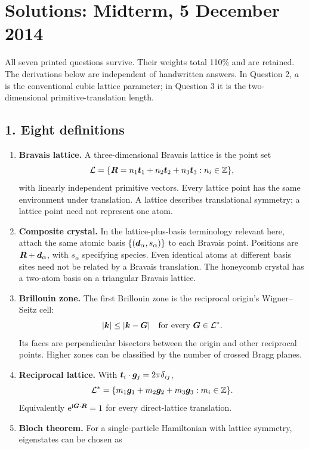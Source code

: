 \chapter{Solutions: Midterm, 5 December 2014}
\label{s:theory-2014-12-midterm}
\begin{sourceNote}
All seven printed questions survive. Their weights total 110\% and are retained. The derivations below are independent of handwritten answers. In Question 2, $a$ is the conventional cubic lattice parameter; in Question 3 it is the two-dimensional primitive-translation length.
\end{sourceNote}

\section*{1. Eight definitions}
\begin{enumerate}[label=(\alph*)]
\item \textbf{Bravais lattice.}
A three-dimensional Bravais lattice is the point set
\[
\mathcal L=\{\boldsymbol{R}=n_1\boldsymbol{t}_1+n_2\boldsymbol{t}_2+n_3\boldsymbol{t}_3:n_i\in\mathbb Z\},
\]
with linearly independent primitive vectors. Every lattice point has the same environment under translation. A lattice describes translational symmetry; a lattice point need not represent one atom.
\item \textbf{Composite crystal.}
In the lattice-plus-basis terminology relevant here, attach the same atomic basis $\{(\boldsymbol{d}_\alpha,s_\alpha)\}$ to each Bravais point. Positions are $\boldsymbol{R}+\boldsymbol{d}_\alpha$, with $s_\alpha$ specifying species. Even identical atoms at different basis sites need not be related by a Bravais translation. The honeycomb crystal has a two-atom basis on a triangular Bravais lattice.
\item \textbf{Brillouin zone.}
The first Brillouin zone is the reciprocal origin's Wigner--Seitz cell:
\[
|\boldsymbol{k}|\leq|\boldsymbol{k}-\boldsymbol{G}|\quad\hbox{for every }\boldsymbol{G}\in\mathcal L^*.
\]
Its faces are perpendicular bisectors between the origin and other reciprocal points. Higher zones can be classified by the number of crossed Bragg planes.
\item \textbf{Reciprocal lattice.}
With $\boldsymbol{t}_i\cdot\boldsymbol{g}_j=2\pi\delta_{ij}$,
\[
\mathcal L^*=\{m_1\boldsymbol{g}_1+m_2\boldsymbol{g}_2+m_3\boldsymbol{g}_3:m_i\in\mathbb Z\}.
\]
Equivalently $\mathrm{e}^{\mathrm{i}\boldsymbol{G}\cdot\boldsymbol{R}}=1$ for every direct-lattice translation.
\item \textbf{Bloch theorem.}
For a single-particle Hamiltonian with lattice symmetry, eigenstates can be chosen as

\end{enumerate}
